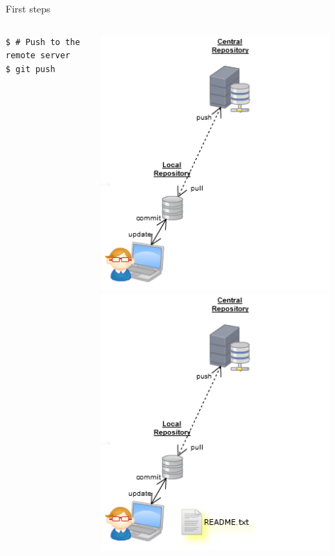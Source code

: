 \begin{frame}[fragile]{First steps}
\begin{columns}
\begin{column}{0.6\textwidth}
\begin{lstlisting}
$ # Push to the remote server
$ git push 
			\end{lstlisting}
		\end{column}
		\begin{column}{0.4\textwidth}
			\begin{center}
				 {
					\includegraphics[width=0.9\textwidth]{empty.png}
				}\only<2-4> {
					\includegraphics[width=0.9\textwidth]{touch.png}
}
\end{center}
\end{column}
\end{columns}
\end{frame}
